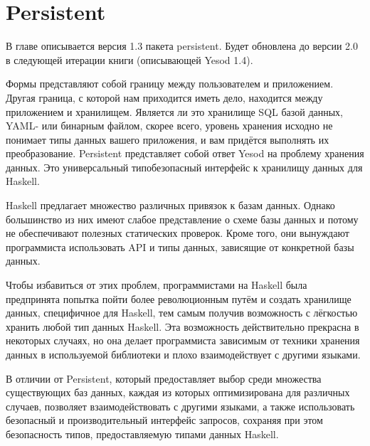 \chapter{Persistent}\label{chap:persistent}

\begin{remark}
    В главе описывается версия 1.3 пакета persistent. Будет обновлена до версии
    2.0 в следующей итерации книги (описывающей Yesod 1.4).
\end{remark}

Формы представляют собой границу между пользователем и приложением. Другая
граница, с которой нам приходится иметь дело, находится между приложением и
хранилищем. Является ли это хранилище SQL базой данных, YAML- или бинарным
файлом, скорее всего, уровень хранения исходно не понимает типы данных вашего
приложения, и вам придётся выполнять их преобразование. Persistent представляет
собой ответ Yesod на проблему хранения данных. Это универсальный типобезопасный
интерфейс к хранилищу данных для Haskell.

Haskell предлагает множество различных привязок к базам данных. Однако
большинство из них имеют слабое представление о схеме базы данных и потому не
обеспечивают полезных статических проверок. Кроме того, они вынуждают
программиста использовать API и типы данных, зависящие от конкретной базы
данных.

Чтобы избавиться от этих проблем, программистами на Haskell была предпринята
попытка пойти более революционным путём и создать хранилище данных, специфичное
для Haskell, тем самым получив возможность с лёгкостью хранить любой тип данных
Haskell. Эта возможность действительно прекрасна в некоторых случаях, но она
делает программиста зависимым от техники хранения данных в используемой
библиотеки и плохо взаимодействует с другими языками.

В отличии от Persistent, который предоставляет выбор среди множества
существующих баз данных, каждая из которых оптимизирована для различных
случаев, позволяет взаимодействовать с другими языками, а также использовать
безопасный и производительный интерфейс запросов, сохраняя при этом
безопасность типов, предоставляемую типами данных Haskell.

